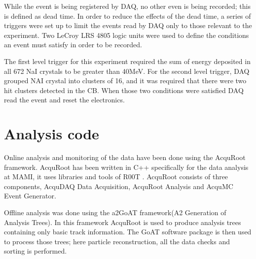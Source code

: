 \indent While the event is being registered by DAQ, no other even is being recorded; this is defined as dead time. In order to reduce the effects of the dead time, a series of triggers were set up to limit the events read by DAQ only to those relevant to the experiment. Two LeCroy LRS 4805 logic units were used to define the conditions an event must satisfy in order to be recorded.

\indent The first level trigger for this experiment required the sum of energy deposited in all 672 NaI crystals to be greater than 40MeV. For the second level trigger, DAQ grouped NAI crystal into clusters of 16, and it was required that there were two hit clusters detected in the CB. When those two conditions were satisfied DAQ read the event and reset the electronics.


\section{Analysis code}

\indent Online analysis and monitoring of the data have been done using the AcquRoot framework. AcquRoot has been written in C++ specifically for the data analysis at MAMI, it uses libraries and tools of R00T \cite{john, root}. AcquRoot consists of three components, AcquDAQ Data Acquisition, AcquRoot Analysis and AcquMC Event Generator.

\indent Offline analysis was done using the a2GoAT framework(A2 Generation of Analysis Trees). In this framework AcquRoot is used to produce analysis trees containing only basic track information. The GoAT software package is then used to process those trees; here particle reconstruction, all the data checks and sorting is performed.
